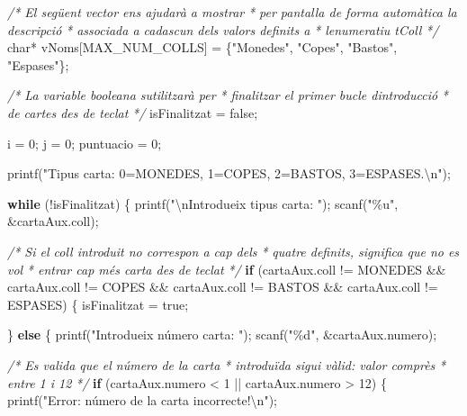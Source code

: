\documentclass[
]{book}
\newenvironment{Shaded}{\begin{snugshade}}{\end{snugshade}}
\newcommand{\CommentTok}[1]{\textcolor[rgb]{0.56,0.35,0.01}{\textit{#1}}}
\newcommand{\ControlFlowTok}[1]{\textcolor[rgb]{0.13,0.29,0.53}{\textbf{#1}}}
\newcommand{\DataTypeTok}[1]{\textcolor[rgb]{0.13,0.29,0.53}{#1}}
\newcommand{\DecValTok}[1]{\textcolor[rgb]{0.00,0.00,0.81}{#1}}
\newcommand{\NormalTok}[1]{#1}
\newcommand{\SpecialCharTok}[1]{\textcolor[rgb]{0.00,0.00,0.00}{#1}}
\newcommand{\StringTok}[1]{\textcolor[rgb]{0.31,0.60,0.02}{#1}}
\begin{document}
\begin{Shaded}
\begin{Highlighting}[]
    \CommentTok{/* El següent vector ens ajudarà a mostrar}
\CommentTok{     * per pantalla de forma automàtica la descripció }
\CommentTok{     * associada a cadascun dels valors definits a }
\CommentTok{     * l\textquotesingle{}enumeratiu tColl}
\CommentTok{     */}
    \DataTypeTok{char}\NormalTok{* vNoms[MAX\_NUM\_COLLS] = \{}\StringTok{"Monedes"}\NormalTok{, }\StringTok{"Copes"}\NormalTok{, }\StringTok{"Bastos"}\NormalTok{, }\StringTok{"Espases"}\NormalTok{\};}

    \CommentTok{/* La variable booleana s\textquotesingle{}utilitzarà per}
\CommentTok{     * finalitzar el primer bucle d\textquotesingle{}introducció}
\CommentTok{     * de cartes des de teclat}
\CommentTok{     */}
\NormalTok{    isFinalitzat = false;}
    
\NormalTok{    i = }\DecValTok{0}\NormalTok{;}
\NormalTok{    j = }\DecValTok{0}\NormalTok{;}
\NormalTok{    puntuacio = }\DecValTok{0}\NormalTok{;}
    
\NormalTok{    printf(}\StringTok{"Tipus carta: 0=MONEDES, 1=COPES, 2=BASTOS, 3=ESPASES.}\SpecialCharTok{\textbackslash{}n}\StringTok{"}\NormalTok{);}

    \ControlFlowTok{while}\NormalTok{ (!isFinalitzat) \{}
\NormalTok{        printf(}\StringTok{"}\SpecialCharTok{\textbackslash{}n}\StringTok{Introdueix tipus carta: "}\NormalTok{);}
\NormalTok{        scanf(}\StringTok{"\%u"}\NormalTok{, \&cartaAux.coll);}
        
        \CommentTok{/* Si el coll introduit no correspon a cap dels}
\CommentTok{         * quatre definits, significa que no es vol }
\CommentTok{         * entrar cap més carta des de teclat}
\CommentTok{         */}
        \ControlFlowTok{if}\NormalTok{ (cartaAux.coll != MONEDES \&\& cartaAux.coll != COPES}
\NormalTok{            \&\& cartaAux.coll != BASTOS \&\& cartaAux.coll != ESPASES) \{}
\NormalTok{            isFinalitzat = true;}

\NormalTok{        \} }\ControlFlowTok{else}\NormalTok{ \{}
\NormalTok{            printf(}\StringTok{"Introdueix número carta: "}\NormalTok{);}
\NormalTok{            scanf(}\StringTok{"\%d"}\NormalTok{, \&cartaAux.numero);}
            
            \CommentTok{/* Es valida que el número de la carta}
\CommentTok{             * introduïda sigui vàlid: valor comprès}
\CommentTok{             * entre 1 i 12}
\CommentTok{             */}
            \ControlFlowTok{if}\NormalTok{ (cartaAux.numero \textless{} }\DecValTok{1}\NormalTok{ || cartaAux.numero \textgreater{} }\DecValTok{12}\NormalTok{) \{}
\NormalTok{                printf(}\StringTok{"Error: número de la carta incorrecte!}\SpecialCharTok{\textbackslash{}n}\StringTok{"}\NormalTok{);}
                

\end{Highlighting}
\end{Shaded}
\end{document}
